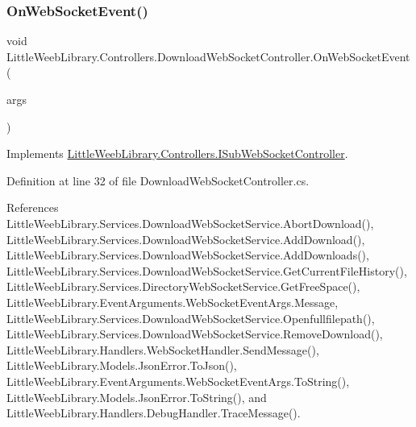 \subsubsection{\texorpdfstring{On\+Web\+Socket\+Event()}{OnWebSocketEvent()}}
{\footnotesize\ttfamily void Little\+Weeb\+Library.\+Controllers.\+Download\+Web\+Socket\+Controller.\+On\+Web\+Socket\+Event (\begin{DoxyParamCaption}\item[{\mbox{\hyperlink{class_little_weeb_library_1_1_event_arguments_1_1_web_socket_event_args}{Web\+Socket\+Event\+Args}}}]{args }\end{DoxyParamCaption})}



Implements \mbox{\hyperlink{interface_little_weeb_library_1_1_controllers_1_1_i_sub_web_socket_controller_adcb26b7b397d6a67ccbf114008c29985}{Little\+Weeb\+Library.\+Controllers.\+I\+Sub\+Web\+Socket\+Controller}}.



Definition at line 32 of file Download\+Web\+Socket\+Controller.\+cs.



References Little\+Weeb\+Library.\+Services.\+Download\+Web\+Socket\+Service.\+Abort\+Download(), Little\+Weeb\+Library.\+Services.\+Download\+Web\+Socket\+Service.\+Add\+Download(), Little\+Weeb\+Library.\+Services.\+Download\+Web\+Socket\+Service.\+Add\+Downloads(), Little\+Weeb\+Library.\+Services.\+Download\+Web\+Socket\+Service.\+Get\+Current\+File\+History(), Little\+Weeb\+Library.\+Services.\+Directory\+Web\+Socket\+Service.\+Get\+Free\+Space(), Little\+Weeb\+Library.\+Event\+Arguments.\+Web\+Socket\+Event\+Args.\+Message, Little\+Weeb\+Library.\+Services.\+Download\+Web\+Socket\+Service.\+Openfullfilepath(), Little\+Weeb\+Library.\+Services.\+Download\+Web\+Socket\+Service.\+Remove\+Download(), Little\+Weeb\+Library.\+Handlers.\+Web\+Socket\+Handler.\+Send\+Message(), Little\+Weeb\+Library.\+Models.\+Json\+Error.\+To\+Json(), Little\+Weeb\+Library.\+Event\+Arguments.\+Web\+Socket\+Event\+Args.\+To\+String(), Little\+Weeb\+Library.\+Models.\+Json\+Error.\+To\+String(), and Little\+Weeb\+Library.\+Handlers.\+Debug\+Handler.\+Trace\+Message().


